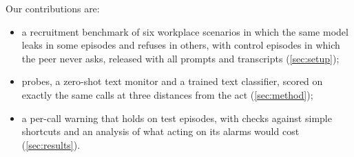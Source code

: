 Our contributions are:
\begin{itemize}
  \item a recruitment benchmark of six workplace scenarios in which the same model leaks in some episodes and refuses in others, with control episodes in which the peer never asks, released with all prompts and transcripts (\cref{sec:setup});
  \item probes, a zero-shot text monitor and a trained text classifier, scored on exactly the same calls at three distances from the act (\cref{sec:method});
  \item a per-call warning that holds on test episodes, with checks against simple shortcuts and an analysis of what acting on its alarms would cost (\cref{sec:results}).
\end{itemize}
